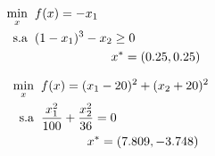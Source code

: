 
\vspace{-0.5cm}

\begin{subequations}
  \label{prob_s2}
  \begin{align}
    \hspace{0pt}\hfill \underset{x}{\text{min}} \hspace{0.2cm} & f(x) = -x_1 \hspace{3.7cm} \\
    \hspace{0pt}\hfill \text{s.a} \hspace{0.2cm} &  (1-x_1)^3 - x_2 \geq 0 \hspace{3.7cm} \\
    \hspace{0pt}\hfill & \hspace{2.15cm} x^* = (0.25, 0.25) \hspace{3.7cm}
  \end{align}
\end{subequations}

\vspace{-0.5cm}


\begin{subequations}
  \label{prob_s3}
  \begin{align}
    \hspace{0pt}\hfill \underset{x}{\text{min}} \hspace{0.2cm} & f(x) =  (x_1 - 20)^2 + (x_2 + 20)^2 \hspace{3.28cm} \\
    \hspace{0pt}\hfill \text{s.a} \hspace{0.2cm} & \frac{x_1^2}{100} + \frac{x_2^2}{36} = 0 \hspace{3.28cm} \\
    \hspace{0pt}\hfill & \hspace{1.3cm} x^* = (7.809, -3.748) \hspace{3.28cm}
  \end{align}
\end{subequations}


